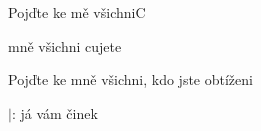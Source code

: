 \setcounter{page}{112}
\begin{song}{Pojďte ke mě všichni}{C}{}
\begin{SBChorus*}
  mně všichni    cujete  

Pojďte ke mně všichni, kdo jste obtíženi

$|$:   já         vám  činek  
\end{SBChorus*}
\end{song}

\pagebreak
